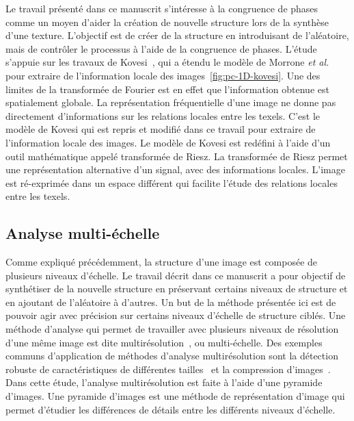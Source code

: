 Le travail présenté dans ce manuscrit s'intéresse à la congruence de phases comme un moyen d'aider la création de nouvelle structure lors de la synthèse d'une texture. L'objectif est de créer de la structure en introduisant de l'aléatoire, mais de contrôler le processus à l'aide de la congruence de phases. L'étude s'appuie sur les travaux de Kovesi~\cite{kovesi_image_1995}, qui a étendu le modèle de Morrone \textit{et al.}~\cite{morrone_feature_1988, morrone_feature_1987} pour extraire de l'information locale des images~\ref{fig:pc-1D-kovesi}. Une des limites de la transformée de Fourier est en effet que l'information obtenue est spatialement globale. La représentation fréquentielle d'une image ne donne pas directement d'informations sur les relations locales entre les texels. C'est le modèle de Kovesi qui est repris et modifié dans ce travail pour extraire de l'information locale des images. Le modèle de Kovesi est redéfini à l'aide d'un outil mathématique appelé transformée de Riesz. La transformée de Riesz permet une représentation alternative d'un signal, avec des informations locales. L'image est ré-exprimée dans un espace différent qui facilite l'étude des relations locales entre les texels.

\subsection{Analyse multi-échelle}

Comme expliqué précédemment, la structure d'une image est composée de plusieurs niveaux d'échelle. Le travail décrit dans ce manuscrit a pour objectif de synthétiser de la nouvelle structure en préservant certains niveaux de structure et en ajoutant de l'aléatoire à d'autres. Un but de la méthode présentée ici est de pouvoir agir avec précision sur certains niveaux d'échelle de structure ciblés. Une méthode d'analyse qui permet de travailler avec plusieurs niveaux de résolution d'une même image est dite multirésolution~\cite{mallat_theory_1989}, ou multi-échelle. Des exemples communs d'application de méthodes d'analyse multirésolution sont la détection robuste de caractéristiques de différentes tailles~\cite{park_multiresolution_2010} et la compression d'images~\cite{averbuch_image_1996}. Dans cette étude, l'analyse multirésolution est faite à l'aide d'une pyramide d'images. Une pyramide d'images est une méthode de représentation d'image qui permet d'étudier les différences de détails entre les différents niveaux d'échelle.

